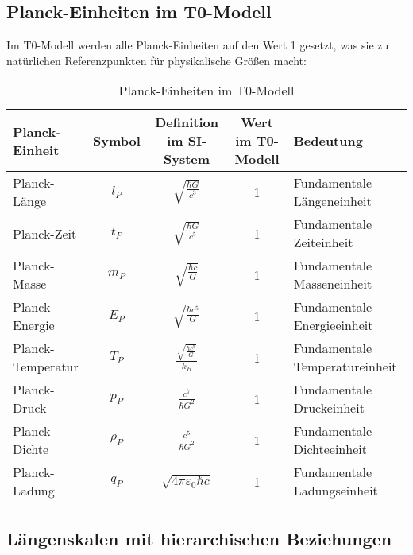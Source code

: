 \documentclass[12pt,a4paper]{article}
\begin{document}
	\subsection*{Planck-Einheiten im T0-Modell}
	
	Im T0-Modell werden alle Planck-Einheiten auf den Wert 1 gesetzt, was sie zu natürlichen Referenzpunkten für physikalische Größen macht:
	
\begin{table}[H]
	\centering
	\begin{adjustbox}{width=0.95\textwidth}  %
		\begin{tabular}{lcccl}
			\toprule
			\textbf{Planck-Einheit} & \textbf{Symbol} & \textbf{Definition im SI-System} & \textbf{Wert im T0-Modell} & \textbf{Bedeutung} \\
			\midrule
			Planck-Länge & \(l_P\) & \(\sqrt{\frac{\hbar G}{c^3}}\) & 1 & Fundamentale Längeneinheit \\
			Planck-Zeit & \(t_P\) & \(\sqrt{\frac{\hbar G}{c^5}}\) & 1 & Fundamentale Zeiteinheit \\
			Planck-Masse & \(m_P\) & \(\sqrt{\frac{\hbar c}{G}}\) & 1 & Fundamentale Masseneinheit \\
			Planck-Energie & \(E_P\) & \(\sqrt{\frac{\hbar c^5}{G}}\) & 1 & Fundamentale Energieeinheit \\
			Planck-Temperatur & \(T_P\) & \(\frac{\sqrt{\frac{\hbar c^5}{G}}}{k_B}\) & 1 & Fundamentale Temperatureinheit \\
			Planck-Druck & \(p_P\) & \(\frac{c^7}{\hbar G^2}\) & 1 & Fundamentale Druckeinheit \\
			Planck-Dichte & \(\rho_P\) & \(\frac{c^5}{\hbar G^2}\) & 1 & Fundamentale Dichteeinheit \\
			Planck-Ladung & \(q_P\) & \(\sqrt{4\pi \varepsilon_0 \hbar c}\) & 1 & Fundamentale Ladungseinheit \\
			\bottomrule
		\end{tabular}
	\end{adjustbox}
	\caption{Planck-Einheiten im T0-Modell}
	\label{tab:planck_einheiten}
\end{table}
	
	\subsection*{Längenskalen mit hierarchischen Beziehungen}
	
\end{document}
